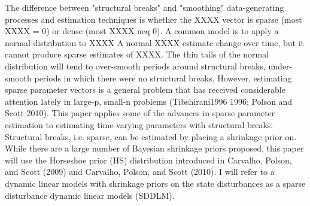 The difference between "structural breaks" and "smoothing" data-generating processes and estimation techniques is whether the XXXX vector is sparse (most XXXX = 0) or dense (most XXXX neq 0).
A common model is to apply a normal distribution to XXXX
A normal XXXX  estimate change over time, but it cannot produce sparse estimates of XXXX.
The thin tails of the normal distribution will tend to over-smooth periods around structural breaks, under-smooth periods in which there were no structural breaks.
However, estimating sparse parameter vectors is a general problem that has received considerable attention lately in large-p, small-n problems (Tibshirani1996 1996; Polson and Scott 2010). This paper applies some of the advances in sparse parameter estimation to estimating time-varying parameters with structural breaks. Structural breaks, i.e. sparse, can be estimated by placing a shrinkage prior on.
While there are a large number of Bayesian shrinkage priors proposed, this paper will use the Horseshoe prior (HS) distribution introduced in Carvalho, Polson, and Scott (2009) and Carvalho, Polson, and Scott (2010). I will refer to a dynamic linear models with shrinkage priors on the state disturbances as a sparse disturbance dynamic linear models (SDDLM).

